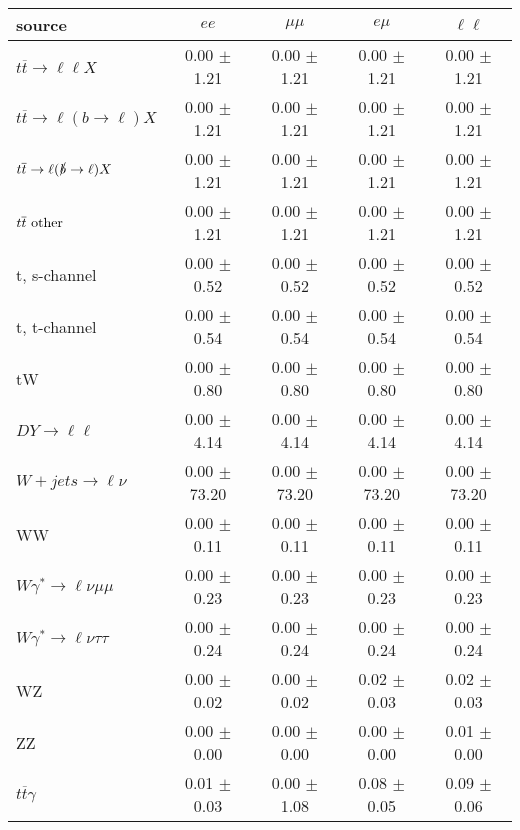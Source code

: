 \begin{tabular}{l|cccc} \hline\hline
source & $ee$ & $\mu\mu$ & $e\mu$ & $\ell\ell $ \\
\hline
$t\overline{t} \rightarrow \ell \ell X$ &  0.00 $\pm$  1.21 &  0.00 $\pm$  1.21 &  0.00 $\pm$  1.21 &  0.00 $\pm$  1.21 \\
$t\overline{t} \rightarrow \ell (b \rightarrow \ell) X$ &  0.00 $\pm$  1.21 &  0.00 $\pm$  1.21 &  0.00 $\pm$  1.21 &  0.00 $\pm$  1.21 \\
$t\overline{t} \rightarrow \ell (\slashed b \rightarrow \ell) X$ &  0.00 $\pm$  1.21 &  0.00 $\pm$  1.21 &  0.00 $\pm$  1.21 &  0.00 $\pm$  1.21 \\
        $t\overline{t}\ \rm{other}$ &  0.00 $\pm$  1.21 &  0.00 $\pm$  1.21 &  0.00 $\pm$  1.21 &  0.00 $\pm$  1.21 \\
\hline
                       t, s-channel &  0.00 $\pm$  0.52 &  0.00 $\pm$  0.52 &  0.00 $\pm$  0.52 &  0.00 $\pm$  0.52 \\
                       t, t-channel &  0.00 $\pm$  0.54 &  0.00 $\pm$  0.54 &  0.00 $\pm$  0.54 &  0.00 $\pm$  0.54 \\
                                 tW &  0.00 $\pm$  0.80 &  0.00 $\pm$  0.80 &  0.00 $\pm$  0.80 &  0.00 $\pm$  0.80 \\
\hline
         $DY \rightarrow \ell \ell$ &  0.00 $\pm$  4.14 &  0.00 $\pm$  4.14 &  0.00 $\pm$  4.14 &  0.00 $\pm$  4.14 \\
      $W+jets \rightarrow \ell \nu$ &  0.00 $\pm$ 73.20 &  0.00 $\pm$ 73.20 &  0.00 $\pm$ 73.20 &  0.00 $\pm$ 73.20 \\
                                 WW &  0.00 $\pm$  0.11 &  0.00 $\pm$  0.11 &  0.00 $\pm$  0.11 &  0.00 $\pm$  0.11 \\
\hline
$W\gamma^{*} \rightarrow \ell \nu \mu\mu$ &  0.00 $\pm$  0.23 &  0.00 $\pm$  0.23 &  0.00 $\pm$  0.23 &  0.00 $\pm$  0.23 \\
$W\gamma^{*} \rightarrow \ell \nu \tau\tau$ &  0.00 $\pm$  0.24 &  0.00 $\pm$  0.24 &  0.00 $\pm$  0.24 &  0.00 $\pm$  0.24 \\
                                 WZ &  0.00 $\pm$  0.02 &  0.00 $\pm$  0.02 &  0.02 $\pm$  0.03 &  0.02 $\pm$  0.03 \\
                                 ZZ &  0.00 $\pm$  0.00 &  0.00 $\pm$  0.00 &  0.00 $\pm$  0.00 &  0.01 $\pm$  0.00 \\
\hline
              $t\overline{t}\gamma$ &  0.01 $\pm$  0.03 &  0.00 $\pm$  1.08 &  0.08 $\pm$  0.05 &  0.09 $\pm$  0.06 \\

\end{tabular}
